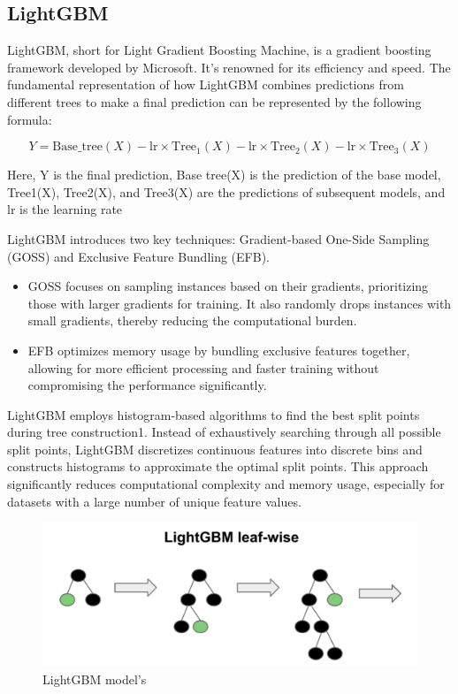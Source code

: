 \documentclass{ieeeojies}
\begin{document}
 \subsection{LightGBM}
 LightGBM, short for Light Gradient Boosting Machine, is a gradient boosting framework developed by Microsoft. It’s renowned for its efficiency and speed. The fundamental representation of how LightGBM combines predictions from different trees to make a final prediction can be represented by the following formula:

\[ 
Y = \text{Base\_tree}(X) - \text{lr} \times \text{Tree}_{1}(X) - \text{lr} \times \text{Tree}_{2}(X) - \text{lr} \times \text{Tree}_{3}(X) 
\]

 Here, Y is the final prediction, Base tree(X) is the prediction of the base model, Tree1(X), Tree2(X), and Tree3(X) are the predictions of subsequent models, and lr is the learning rate

 LightGBM introduces two key techniques: Gradient-based One-Side Sampling (GOSS) and Exclusive Feature Bundling (EFB).
 
 \begin{itemize}
    \item GOSS focuses on sampling instances based on their gradients, prioritizing those with larger gradients for training. It also randomly drops instances with small gradients, thereby reducing the computational burden.
    \item EFB optimizes memory usage by bundling exclusive features together, allowing for more efficient processing and faster training without compromising the performance significantly.
 \end{itemize}

 LightGBM employs histogram-based algorithms to find the best split points during tree construction1. Instead of exhaustively searching through all possible split points, LightGBM discretizes continuous features into discrete bins and constructs histograms to approximate the optimal split points. This approach significantly reduces computational complexity and memory usage, especially for datasets with a large number of unique feature values.

 \begin{figure}[H]
  \centering
  \begin{minipage}{0.8\linewidth}
    \centering
    \includegraphics[width=\linewidth]{bibliography/Figure/LightGBM_model.png}
    \caption{LightGBM model's}
    \label{fig8}
  \end{minipage}
\end{figure}
 
\end{document}
